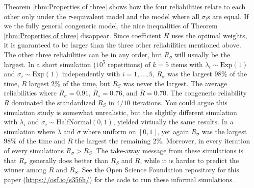 \documentclass[twoside]{article}
\begin{document}
Theorem \ref{thm:Properties of three} shows how the four reliabilities relate to each other only under the $\tau$-equivalent model and the model where all $\sigma_i$s are equal. If we the fully general congeneric model, the nice inequalities of Theorem \ref{thm:Properties of three} disappear. Since coefficient $H$ uses the optimal weights, it is guaranteed to be larger than the three other reliabilities mentioned above. The
other three reliabilities can be in any order, but
$ R_{\sigma}$ will usually be the largest. In a short
simulation ($10^{5}$ repetitions) of $k=5$ items with $\lambda_{i}\sim \textrm{Exp}(1)$
and $\sigma_{i}\sim \textrm{Exp}(1)$ independently with $i=1,\ldots,5$, $ R_{\sigma}$
was the largest $98\%$ of the time, $ R$ largest $2\%$
of the time, but $ R_{S}$ was never the largest. The average reliabilities where $\overline{ R}_\sigma = 0.91$, $\overline{ R}_s= 0.76$, and $\overline{ R} = 0.70$.
The congeneric reliability $ R$ dominated the standardized $ R_{S}$ in $4/10$ iterations. You could argue this simulation study
is somewhat unrealistic, but the slightly different simulation with $\lambda_{i}$ and $\sigma_{i}\sim \textrm{HalfNormal}(0,1)$, yielded virtually the same results. In a simulation where $\lambda$ and $\sigma$ where uniform on $[0,1]$, yet again $ R_{\sigma}$
was the largest $98\%$ of the time and $ R$ the largest the remaining $2\%$. Moreover, in every iteration of every simulations $ R_\sigma >  R_S$. The take-away message from these simulations is that $ R_\sigma$ generally does better than $ R_{S}$ and
$ R$, while it is harder to predict the winner among $ R$
and $ R_{S}$. See the Open Science Foundation repository for this paper (\url{https://osf.io/s356h/}) for the code to run these informal simulations.
\end{document}
